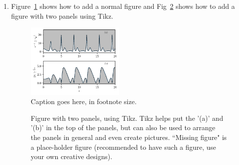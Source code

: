 \documentclass[pre,aps,reprint,noshowpacs,superscriptaddress,floatfix,letterpaper,longbibliography]{revtex4-2}
\begin{document}
\begin{enumerate}
\item Figure~\ref{fig:plot-label} shows how to add a normal figure and Fig~\ref{fig:TikzExample} shows how to add a figure with two panels using Tikz.  
 \begin{figure}[t!] %
	\centering
	\hspace*{-0.75cm}\includegraphics[width=0.45\textwidth]{sample-plot.pdf}
	\caption{\footnotesize{Caption goes here, in footnote size.}}
	\label{fig:plot-label}
\end{figure}
\begin{figure}[tbh] %
\centering
{} 
\caption{
{\footnotesize{Figure with two panels, using Tikz. Tikz helps put the '(a)' and '(b)' in the top of the panels, but can also be used to arrange the panels in general and even create pictures. ``Missing figure" is a place-holder figure (recommended to have such a figure, use your own creative designs). }}}
\label{fig:TikzExample} 
\end{figure} 


\end{enumerate}
\end{document}
